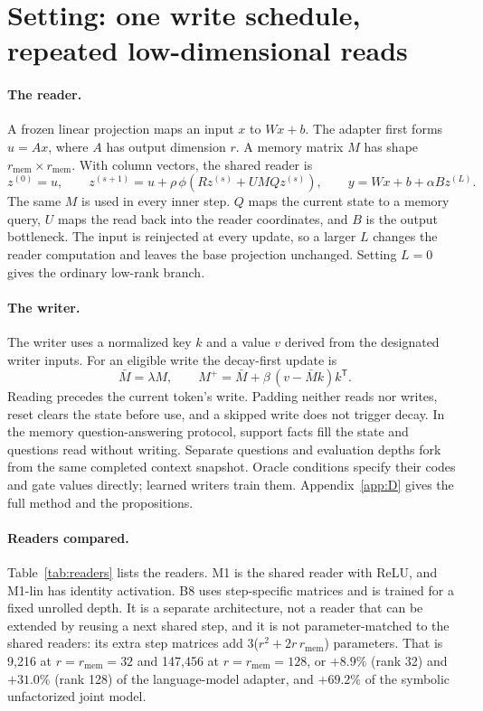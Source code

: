 \section{Setting: one write schedule, repeated low-dimensional reads}
\label{sec:setting}

\paragraph{The reader.}
A frozen linear projection maps an input $x$ to $Wx+b$.
The adapter first forms $u=Ax$, where $A$ has output dimension $r$.
A memory matrix $M$ has shape $r_{\mathrm{mem}}\times r_{\mathrm{mem}}$.
With column vectors, the shared reader is
\[
z^{(0)}=u,\qquad
z^{(s+1)}=u+\rho\,\phi(Rz^{(s)}+UMQz^{(s)}),\qquad
y=Wx+b+\alpha Bz^{(L)}.
\]
The same $M$ is used in every inner step.
$Q$ maps the current state to a memory query, $U$ maps the read back into the reader coordinates, and $B$ is the output bottleneck.
The input is reinjected at every update, so a larger $L$ changes the reader computation and leaves the base projection unchanged.
Setting $L=0$ gives the ordinary low-rank branch.

\paragraph{The writer.}
The writer uses a normalized key $k$ and a value $v$ derived from the designated writer inputs.
For an eligible write the decay-first update is
\[
\bar M=\lambda M,\qquad M^{+}=\bar M+\beta\,(v-\bar Mk)k^{\mathsf T}.
\]
Reading precedes the current token's write.
Padding neither reads nor writes, reset clears the state before use, and a skipped write does not trigger decay.
In the memory question-answering protocol, support facts fill the state and questions read without writing.
Separate questions and evaluation depths fork from the same completed context snapshot.
Oracle conditions specify their codes and gate values directly; learned writers train them.
Appendix~\ref{app:D} gives the full method and the propositions.

\paragraph{Readers compared.}
Table~\ref{tab:readers} lists the readers.
M1 is the shared reader with ReLU, and M1-lin has identity activation.
B8 uses step-specific matrices and is trained for a fixed unrolled depth.
It is a separate architecture, not a reader that can be extended by reusing a next shared step, and it is not parameter-matched to the shared readers: its extra step matrices add 3($r^2+2r\,r_{\mathrm{mem}}$) parameters.
That is 9,216 at $r=r_{\mathrm{mem}}=32$ and 147,456 at $r=r_{\mathrm{mem}}=128$, or $+8.9\%$ (rank 32) and $+31.0\%$ (rank 128) of the language-model adapter, and $+69.2\%$ of the symbolic unfactorized joint model.  %

